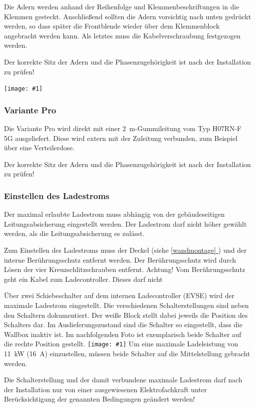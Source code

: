 \documentclass[a4paper,10pt]{article}
\newcommand{\hint}[1]{\begin{tcolorbox}[colback=boxgray,colframe=black,coltext=
white,title=Hinweis]#1\end{tcolorbox}}
\newcommand{\gfx}[1]{\texttt{[image: \#1]}}
\newcommand*{\fullref}[1]{\hyperref[{#1}]{\ref*{#1} \nameref*{#1}}}
\begin{document}
\begin{multicols*}{2}
	Die Adern werden anhand der Reihenfolge und Klemmenbeschriftungen in die
	Klemmen gesteckt. Anschließend sollten die Adern vorsichtig nach unten gedrückt
	werden, so dass später die Frontblende wieder über dem Klemmenblock angebracht
	werden kann.  Als letztes muss die Kabelverschraubung festgezogen werden.

	Der korrekte Sitz der Adern und die Phasenzugehörigkeit ist nach der
	Installation zu prüfen!

	\gfx{./img/resized/warp_wire_ready}

	\subsubsection{Variante Pro}
	Die Variante Pro wird direkt mit einer \SI{2}{\meter}-Gummileitung vom
	Typ H07RN-F 5G ausgeliefert. Diese wird extern mit der Zuleitung verbunden, zum
	Beispiel über eine Verteilerdose.

	Der korrekte Sitz der Adern und die Phasenzugehörigkeit ist nach der
	Installation zu prüfen!

	\subsubsection{Einstellen des Ladestroms}
	Der maximal erlaubte Ladestrom muss abhängig von der gebäudeseitigen
	Leitungsabsicherung eingestellt werden. Der Ladestrom darf nicht höher gewählt
	werden, als die Leitungsabsicherung es zulässt.

	Zum Einstellen des Ladestroms muss der Deckel (siehe \fullref{wandmontage})
	und der interne Berührungsschutz entfernt werden. Der Berührungsschutz wird
	durch Lösen der vier Kreuzschlitzschrauben entfernt. Achtung! Vom
	Berührungsschutz geht ein Kabel zum Ladecontroller. Dieses darf nicht

	Über zwei Schiebeschalter auf dem internen Ladecontroller (EVSE) wird der
	maximale Ladestrom eingestellt. Die verschiedenen Schalterstellungen sind neben
	den Schaltern dokumentiert. Der weiße Block stellt dabei jeweils die Position
	des Schalters dar. Im Auslieferungszustand sind die Schalter so eingestellt,
	dass die Wallbox inaktiv ist. Im nachfolgenden Foto ist exemplarisch beide
	Schalter auf die rechte Position gestellt. \gfx{./img/resized/warp_evse_switch_cut_ready} Um eine
	maximale Ladeleistung von \SI{11}{\kilo\watt} (\SI{16}{\ampere}) einzustellen, müssen beide
	Schalter auf die Mittelstellung gebracht werden. \hint{Die Schalterstellung und der damit verbundene maximale Ladestrom darf nach der
		Installation nur von einer ausgewiesenen Elektrofachkraft unter
		Berücksichtigung der genannten Bedingungen geändert werden!}


\end{multicols*}
\end{document}
